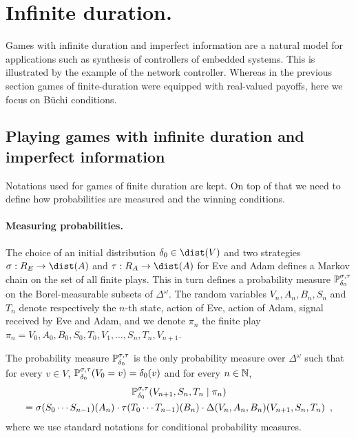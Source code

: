  
\section{Infinite duration.}


Games with infinite duration and imperfect information
are a natural model for applications such as synthesis 
of controllers of embedded systems.
This is illustrated by the example of the network controller.
Whereas in the previous section games of finite-duration
were equipped with real-valued payoffs, 
here we focus on B{\"u}chi conditions.


\subsection{Playing games with infinite duration and imperfect information }

Notations used for games of finite duration are kept.
On top of that we need to define how probabilities are measured
and the winning conditions.

\paragraph{Measuring probabilities.}
The choice of an initial distribution
$\ini\in\dist(V)$ 
and two strategies
$\sigma:  R_E \to \dist(A)$
and $\tau:  R_A \to \dist(A)$
for Eve and Adam
defines a Markov chain on the set of all finite plays.
This in turn defines a probability measure
$\mathbb{P}_{\delta_0}^{\sigma,\tau}$ on the Borel-measurable
subsets of $\Delta^\omega$.
The random variables $V_n,A_n,B_n,S_{n}$ and $T_{n}$ denote
respectively the $n$-th state, action of Eve, action of Adam, 
signal received by Eve and Adam,
and we denote $\pi_n$ the finite play 
$\pi_n = V_0,A_0,B_0,S_0,T_0,V_1,\ldots,S_{n},T_{n},V_{n+1}$.

The probability measure $\mathbb{P}_{\delta_0}^{\sigma,\tau}$ is the only
probability measure over $\Delta^\omega$ such that
for every $v\in V$, 
$\mathbb{P}^{\sigma,\tau}_{\delta_0}(V_0 = v) = \delta_0(v)$
and for every $n\in\mathbb{N}$,
\begin{multline*}
\mathbb{P}^{\sigma,\tau}_{\delta_0}(V_{n+1}, S_{n}, T_{n} \mid \pi_n) \\
= \sigma(S_0\cdots S_{n-1})(A_{n}) \cdot \tau(T_0\cdots T_{n-1})(B_n) \cdot \Delta(V_n,A_n,B_n)(V_{n+1},S_{n},T_{n})\enspace,
\end{multline*}
where we use standard notations for conditional probability measures.


